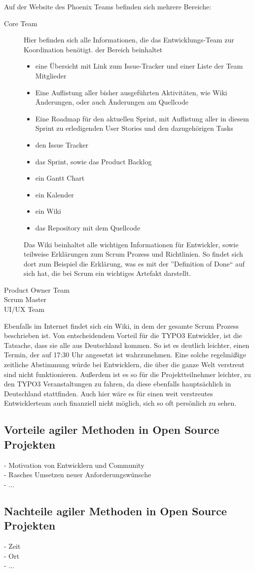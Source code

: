Auf der Website des Phoenix Teams befinden sich mehrere Bereiche:
\begin{description}
\item [Core Team] Hier befinden sich alle Informationen, die das Entwicklungs-Team zur Koordination
benötigt. der Bereich beinhaltet
\begin{itemize}
\item eine Übersicht mit Link zum Issue-Tracker und einer Liste der Team Mitglieder
\item Eine Auflistung aller bisher ausgeführten Aktivitäten, wie Wiki Änderungen, oder auch
Änderungen am Quellcode
\item Eine Roadmap für den aktuellen Sprint, mit Auflistung aller in diesem Sprint zu erledigenden
User Stories und den dazugehörigen Tasks
\item den Issue Tracker
\item das Sprint, sowie das Product Backlog
\item ein Gantt Chart
\item ein Kalender
\item  ein Wiki
\item das Repository mit dem Quellcode
\end{itemize}
Das Wiki beinhaltet alle wichtigen Informationen für Entwickler, sowie teilweise Erklärungen zum
Scrum Prozess und Richtlinien.  So findet sich dort zum Beispiel die Erklärung, was es mit der
''Definition of Done``  auf sich hat, die
bei Scrum ein wichtiges Artefakt darstellt.
\item [Product Owner Team]
\item [Scrum Master]
\item [UI/UX Team]
\end{description}
Ebenfalls im Internet findet sich ein Wiki, in dem der gesamte Scrum Prozess beschrieben ist.
Von entscheidendem Vorteil für die TYPO3 Entwickler, ist die Tatsache, dass sie alle aus
Deutschland kommen. So ist es deutlich leichter, einen Termin, der auf 17:30 Uhr angesetzt ist
wahrzunehmen. Eine solche regelmäßige zeitliche Abstimmung würde bei Entwicklern, die über die
ganze Welt verstreut sind nicht funktionieren. Außerdem ist es so für die Projektteilnehmer
leichter, zu den TYPO3 Veranstaltungen zu fahren, da diese ebenfalls hauptsächlich in Deutschland
stattfinden. Auch hier wäre es für einen weit verstreutes Entwicklerteam auch finanziell nicht
möglich, sich so oft persönlich zu sehen.



\subsection{Vorteile agiler Methoden in Open Source Projekten}
  - Motivation von Entwicklern und Community\\
  - Rasches Umsetzen neuer Anforderungswünsche\\
  - ...
  
\subsection{Nachteile agiler Methoden in Open Source Projekten}
  - Zeit\\
  - Ort\\
  - ...


